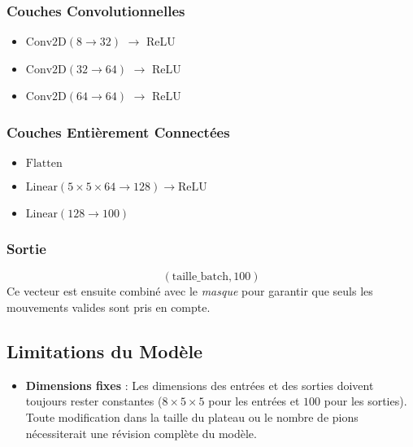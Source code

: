 \documentclass[]{article}
\begin{document}
\subsubsection{Couches Convolutionnelles}
\begin{itemize}
    \item \(\text{Conv2D}(8 \rightarrow 32)\) \(\rightarrow\) ReLU
    \item \(\text{Conv2D}(32 \rightarrow 64)\) \(\rightarrow\) ReLU
    \item \(\text{Conv2D}(64 \rightarrow 64)\) \(\rightarrow\) ReLU
\end{itemize}

\subsubsection{Couches Entièrement Connectées}
\begin{itemize}
    \item \(\text{Flatten}\)
    \item \(\text{Linear}(5 \times 5 \times 64 \rightarrow 128) \rightarrow \text{ReLU}\)
    \item \(\text{Linear}(128 \rightarrow 100)\)
\end{itemize}

\subsubsection{Sortie}
\[
(\text{taille\_batch}, 100)
\]
Ce vecteur est ensuite combiné avec le \textit{masque} pour garantir que seuls les mouvements valides sont pris en compte.

\subsection{Limitations du Modèle}
\begin{itemize}
    \item \textbf{Dimensions fixes} : Les dimensions des entrées et des sorties doivent toujours rester constantes (\(8 \times 5 \times 5\) pour les entrées et \(100\) pour les sorties). Toute modification dans la taille du plateau ou le nombre de pions nécessiterait une révision complète du modèle.
\end{itemize}
\end{document}
